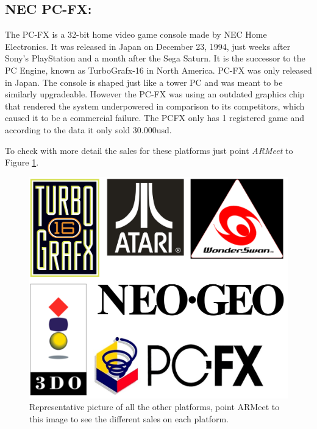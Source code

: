  \subsection{NEC PC-FX:}
 The PC-FX is a 32-bit home video game console made by NEC Home
 Electronics. It was released in Japan on December 23, 1994, just weeks after
 Sony's PlayStation and a month after the Sega Saturn. It is the successor to
 the PC Engine, known as TurboGrafx-16 in North America. PC-FX was only
 released in Japan. The console is shaped just like a tower PC and was meant
 to be similarly upgradeable. However the PC-FX was using an outdated
 graphics chip that rendered the system underpowered in comparison to its
 competitors, which caused it to be a commercial failure\cite{PCFX}. The PCFX only has 1
 registered game and according to the data it only sold 30.000usd.\newpage

To check with more detail the sales for these platforms just point
\textit{ARMeet} to Figure \ref{fig:OtherImage}.\\

\begin{figure}[h]
  \centering
  \centerline{\includegraphics[scale=0.2]{images/OtherMainTarget.png}}
  \caption{Representative picture of all the other platforms, point ARMeet to this image to
    see the different sales on each platform.}
  \label{fig:OtherImage}
\end{figure}






